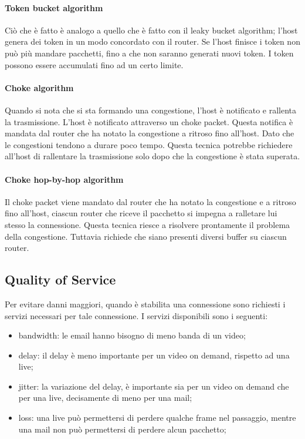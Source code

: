 \documentclass{article}
\begin{document}
\paragraph{Token bucket algorithm}
Ciò che è fatto è analogo a quello che è fatto con il leaky bucket algorithm;
l'host genera dei token in un modo concordato con il router. Se l'host finisce i
token non può più mandare pacchetti, fino a che non saranno generati nuovi
token. I token possono essere accumulati fino ad un certo limite.\\

\paragraph{Choke algorithm}
Quando si nota che si sta formando una congestione, l'host è notificato e
rallenta la trasmissione. L'host è notificato attraverso un choke packet.
Questa notifica è mandata dal router che ha notato la congestione a ritroso
fino all'host. Dato che le congestioni tendono a durare poco tempo. Questa
tecnica potrebbe richiedere all'host di rallentare la trasmissione solo dopo che
la congestione è stata superata.\\

\paragraph{Choke hop-by-hop algorithm}
Il choke packet viene mandato dal router che ha notato la congestione e a
ritroso fino all'host, ciascun router che riceve il pacchetto si impegna a
ralletare lui stesso la connessione. Questa tecnica riesce a risolvere
prontamente il problema della congestione. Tuttavia richiede che siano presenti
diversi buffer su ciascun router.\\

\subsection{Quality of Service}
Per evitare danni maggiori, quando è stabilita una connessione sono richiesti i
servizi necessari per tale connessione. I servizi disponibili sono i seguenti:
\begin{itemize}
	\item bandwidth: le email hanno bisogno di meno banda di un video;

	\item delay: il delay è meno importante per un video on demand, rispetto ad
		una live;

	\item jitter: la variazione del delay, è importante sia per un video on
		demand che per una live, decisamente di meno per una mail;

	\item loss: una live può permettersi di perdere qualche frame nel passaggio, 
		mentre una mail non può permettersi di perdere alcun pacchetto;
\end{itemize}
\end{document}
